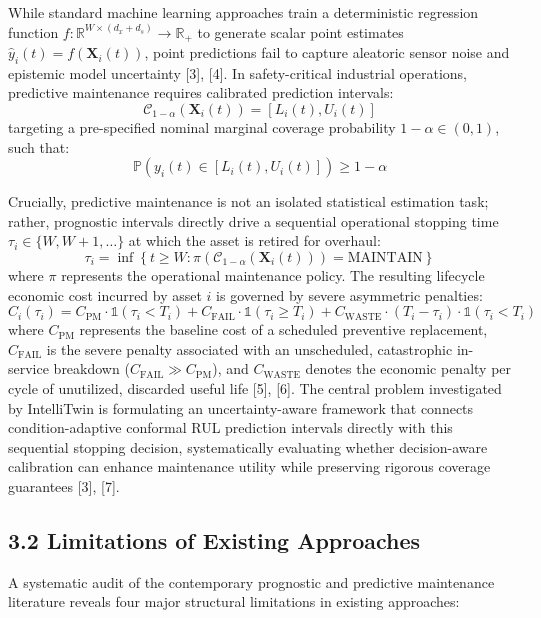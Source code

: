 \documentclass[12pt,a4paper]{article}
\begin{document}
While standard machine learning approaches train a deterministic regression function $f: \mathbb{R}^{W \times (d_x + d_s)} \to \mathbb{R}_+$ to generate scalar point estimates $\hat{y}_i(t) = f(\mathbf{X}_i(t))$, point predictions fail to capture aleatoric sensor noise and epistemic model uncertainty [3], [4]. In safety-critical industrial operations, predictive maintenance requires calibrated prediction intervals:
\begin{equation}
\mathcal{C}_{1-\alpha}(\mathbf{X}_i(t)) = [L_i(t), U_i(t)]
\end{equation}
targeting a pre-specified nominal marginal coverage probability $1 - \alpha \in (0, 1)$, such that:
\begin{equation}
\mathbb{P}\left( y_i(t) \in [L_i(t), U_i(t)] \right) \ge 1 - \alpha
\end{equation}

Crucially, predictive maintenance is not an isolated statistical estimation task; rather, prognostic intervals directly drive a sequential operational stopping time $\tau_i \in \{W, W+1, \dots\}$ at which the asset is retired for overhaul:
\begin{equation}
\tau_i = \inf \left\{ t \ge W : \pi\left(\mathcal{C}_{1-\alpha}(\mathbf{X}_i(t))\right) = \text{MAINTAIN} \right\}
\end{equation}
where $\pi$ represents the operational maintenance policy. The resulting lifecycle economic cost incurred by asset $i$ is governed by severe asymmetric penalties:
\begin{equation}
C_i(\tau_i) = C_{\text{PM}} \cdot \mathbb{1}(\tau_i < T_i) + C_{\text{FAIL}} \cdot \mathbb{1}(\tau_i \ge T_i) + C_{\text{WASTE}} \cdot (T_i - \tau_i) \cdot \mathbb{1}(\tau_i < T_i)
\end{equation}
where $C_{\text{PM}}$ represents the baseline cost of a scheduled preventive replacement, $C_{\text{FAIL}}$ is the severe penalty associated with an unscheduled, catastrophic in-service breakdown ($C_{\text{FAIL}} \gg C_{\text{PM}}$), and $C_{\text{WASTE}}$ denotes the economic penalty per cycle of unutilized, discarded useful life [5], [6]. The central problem investigated by IntelliTwin is formulating an uncertainty-aware framework that connects condition-adaptive conformal RUL prediction intervals directly with this sequential stopping decision, systematically evaluating whether decision-aware calibration can enhance maintenance utility while preserving rigorous coverage guarantees [3], [7].

\subsection*{3.2 Limitations of Existing Approaches}
A systematic audit of the contemporary prognostic and predictive maintenance literature reveals four major structural limitations in existing approaches:
\end{document}
